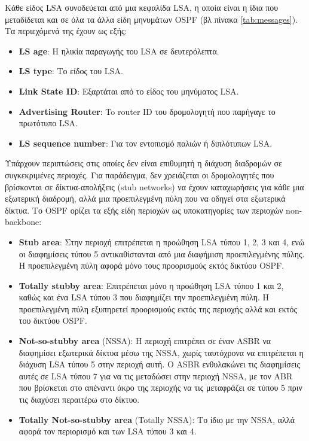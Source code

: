 \documentclass{EdipyLabs} %
\begin{document}
Κάθε είδος LSA συνοδεύεται από μια κεφαλίδα LSA, η οποία είναι η ίδια που μεταδίδεται και σε όλα τα άλλα είδη μηνυμάτων OSPF (βλ πίνακα \ref{tab:messages}). Τα περιεχόμενά της έχουν ως εξής:

\begin{itemize}
	\item \textbf{LS age}: Η ηλικία παραγωγής του LSA σε δευτερόλεπτα.
	\item \textbf{LS type}: Το είδος του LSA.
	\item \textbf{Link State ID}: Εξαρτάται από το είδος του μηνύματος LSA.
	\item \textbf{Advertising Router}: To router ID του δρομολογητή που παρήγαγε το πρωτότυπο LSA.
	\item \textbf{LS sequence number}: Για τον εντοπισμό παλιών ή διπλότυπων LSA.
\end{itemize}

Υπάρχουν περιπτώσεις στις οποίες δεν είναι επιθυμητή η διάχυση διαδρομών σε συγκεκριμένες περιοχές. Για παράδειγμα, δεν χρειάζεται οι δρομολογητές που βρίσκονται σε δίκτυα-απολήξεις (stub networks) να έχουν καταχωρήσεις για κάθε μια εξωτερική διαδρομή, αλλά μια προεπιλεγμένη πύλη που να οδηγεί στα εξωτερικά δίκτυα. Το OSPF ορίζει τα εξής είδη περιοχών ως υποκατηγορίες των περιοχών non-backbone:
\begin{itemize}
	\item \textbf{Stub area}: Στην περιοχή επιτρέπεται η προώθηση LSA τύπου 1, 2, 3 και 4, ενώ οι διαφημίσεις τύπου 5 αντικαθίστανται από μια διαφήμιση προεπιλεγμένης πύλης. Η προεπιλεγμένη πύλη αφορά μόνο τους προορισμούς εκτός δικτύου OSPF.  
	\item \textbf{Totally stubby area}: Eπιτρέπεται μόνο η προώθηση LSA τύπου 1 και 2, καθώς και ένα LSA τύπου 3 που διαφημίζει την προεπιλεγμένη πύλη. Η προεπιλεγμένη πύλη εξυπηρετεί προορισμούς εκτός της περιοχής αλλά και εκτός του δικτύου OSPF.
	\item \textbf{Not-so-stubby area} (NSSA): Η περιοχή επιτρέπει σε έναν ASBR να διαφημίσει εξωτερικά δίκτυα μέσω της NSSA, χωρίς ταυτόχρονα να επιτρέπεται η διάχυση LSA τύπου 5 στην περιοχή αυτή. Ο ASBR ενθυλακώνει τις διαφημίσεις αυτές σε LSA τύπου 7 για να τις μεταδώσει στην περιοχή NSSA, με τον ABR που βρίσκεται στο απέναντι άκρο της περιοχής να τις μεταφράζει σε τύπου 5 πριν τις διαχύσει περαιτέρω στο δίκτυο.
	\item \textbf{Totally Not-so-stubby area} (Totally NSSA): Το ίδιο με την NSSA, αλλά αφορά τον περιορισμό και των LSA τύπου 3 και 4. 
\end{itemize}
\end{document}
